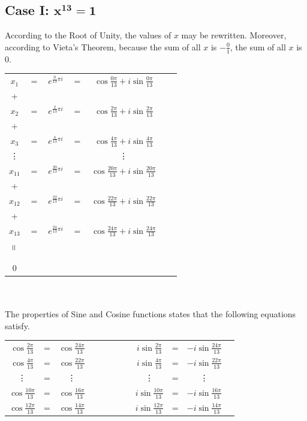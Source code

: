 \documentclass[12pt]{report}
\newcommand{\verteq}{\rotatebox{90}{$\;\;=\;\;$}}
\begin{document}
\subsection*{\textbf{Case I:} $\mathbf{x^{13}=1}$}
According to the Root of Unity, the values of $x$ may be rewritten. Moreover, according to Vieta's Theorem, because the sum of all $x$ is $-\frac{0}{1}$, the sum of all $x$ is 0. \\
\begin{tabular}{ccccccc}
    $x_1$ & $=$ & $e^{\frac{0}{13}\pi i}$ & $=$ & $\cos{\frac{0\pi}{13}} +i\sin{\frac{0\pi}{13}}$\\
    + & & & & \\
    $x_2$ & $=$ & $e^{\frac{2}{13}\pi i}$ & $=$ & $\cos{\frac{2\pi}{13}} +i\sin{\frac{2\pi}{13}}$ \\
    + & & & & \\
    $x_3$ & $=$ & $e^{\frac{4}{13}\pi i}$ & $=$ & $\cos{\frac{4\pi}{13}} +i\sin{\frac{4\pi}{13}}$ \\
    \vdots & & & & \vdots \\
    $x_{11}$ & $=$ & $e^{\frac{20}{13}\pi i}$ & $=$ & $\cos{\frac{20\pi}{13}} +i\sin{\frac{20\pi}{13}}$ \\
    + & & & & \\
    $x_{12}$ & $=$ & $e^{\frac{22}{13}\pi i}$ & $=$ & $\cos{\frac{22\pi}{13}} +i\sin{\frac{22\pi}{13}}$ \\
    + & & & & \\
    $x_{13}$ & $=$ & $e^{\frac{24}{13}\pi i}$ & $=$ & $\cos{\frac{24\pi}{13}} +i\sin{\frac{24\pi}{13}}$ \\
    $\verteq$ & & & & \\
    0 & & & & \\
\end{tabular}
\\\\
The properties of Sine and Cosine functions states that the following equations satisfy. \\
\setlength{\tabcolsep}{10pt}
\renewcommand{\arraystretch}{1.5}
\begin{tabular}{cccccccccccc}
    $\cos{\frac{2\pi}{13}}$ & = & $\cos{\frac{24\pi}{13}}$ & & & & & & $i\sin{\frac{2\pi}{13}}$ & = & $-i\sin{\frac{24\pi}{13}}$ \\
    $\cos{\frac{4\pi}{13}}$ & = & $\cos{\frac{22\pi}{13}}$ & & & & & & $i\sin{\frac{4\pi}{13}}$ & = & $-i\sin{\frac{22\pi}{13}}$ \\
    \vdots & = & \vdots & & & & & & \vdots & = & \vdots \\
    $\cos{\frac{10\pi}{13}}$ & = & $\cos{\frac{16\pi}{13}}$ & & & & & & $i\sin{\frac{10\pi}{13}}$ & = & $-i\sin{\frac{16\pi}{13}}$ \\
    $\cos{\frac{12\pi}{13}}$ & = & $\cos{\frac{14\pi}{13}}$ & & & & & & $i\sin{\frac{12\pi}{13}}$ & = & $-i\sin{\frac{14\pi}{13}}$
\end{tabular} \\
\end{document}
